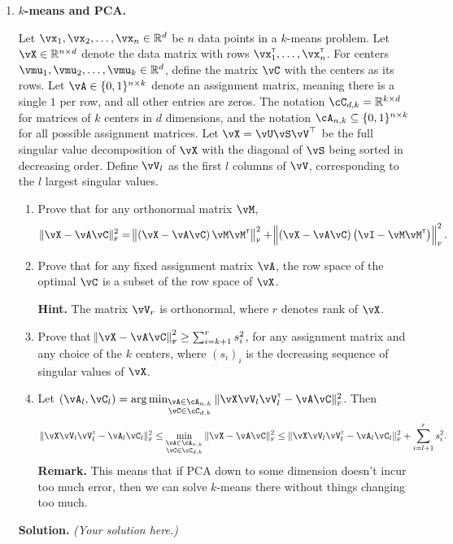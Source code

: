 \documentclass{article}
\DeclareMathOperator*{\argmin}{arg\,min}
\def\R{\mathbb{R}}
\def\tF{{\scriptscriptstyle\textup{F}}}
\newcommand\T{{\scriptscriptstyle\mathsf{T}}}
\theoremstyle{definition}
\theoremstyle{remark}
\newenvironment{Q}
{%
\clearpage
\item
}
{%
\phantom{s}
\bigskip
\textbf{Solution.}
\emph{(Your solution here.)}
}
\begin{document}
\begin{enumerate}

  \begin{Q}
    \textbf{$k$-means and PCA.}

    Let $\vx_1, \vx_2, \ldots, \vx_n \in \R^d$ be $n$ data points in a $k$-means problem. Let $\vX\in\R^{n\times d}$ denote the data matrix with rows $\vx_1^\T,\ldots,\vx_n^\T$. For centers $\vmu_1, \vmu_2, \ldots, \vmu_k \in \R^d$, define the matrix $\vC$ with the centers as its rows. Let $\vA\in\{0,1\}^{n\times k}$ denote an assignment matrix, meaning there is a single $1$ per row, and all other entries are zeros.  The notation $\cC_{d,k}=\R^{k \times d}$ for matrices of $k$ centers in $d$ dimensions, and the notation $\cA_{n,k}\subseteq \{0,1\}^{n\times k}$ for all possible assignment matrices. Let $\vX = \vU\vS\vV^\top$ be the full singular value decomposition of $\vX$ with the diagonal of $\vS$ being sorted in decreasing order. Define $\vV_l$ as the first $l$ columns of $\vV$, corresponding to the $l$ largest singular values.

    \begin{enumerate}
      \item
        Prove that for any orthonormal matrix $\vM$,
        \[
          \|\vX - \vA\vC\|_\tF^2
          =
          \enVert{ \del{\vX - \vA\vC}\vM\vM^\T }_\tF^2
          +
          \enVert{ \del{\vX - \vA\vC}\del{\vI - \vM\vM^\T} }_\tF^2.
        \]

      \item
        Prove that for any fixed assignment matrix $\vA$, the row space of the optimal $\vC$ is a subset of the row space of $\vX$.

        \textbf{Hint.} The matrix $\vV_r$ is orthonormal, where $r$ denotes rank of $\vX$.

      \item
        Prove that $\enVert{ \vX - \vA\vC}_\tF^2 \geq \sum_{i=k+1}^r s_i^2$, for any assignment matrix and any choice of the $k$ centers, where $(s_i)_i$ is the decreasing sequence of singular values of $\vX$.

      \item
        Let $(\vA_l,\vC_l) = \argmin_{\substack{\vA\in\cA_{n,k}\\\vC\in\cC_{d,k}}} \|\vX\vV_l\vV_l^\T - \vA\vC\|_\tF^2$. Then
        \[
          \|\vX\vV_l\vV_l^\T - \vA_l\vC_l\|_\tF^2
          \leq
          \min_{\substack{\vA\in\cA_{n,k}\\\vC\in\cC_{d,k}}} \|\vX - \vA\vC\|_\tF^2
          \leq
          \|\vX\vV_l\vV_l^\T - \vA_l\vC_l\|_\tF^2
          + \sum_{i=l+1}^r s_i^2.
        \]
        \textbf{Remark.}  This means that if PCA down to some dimension doesn't incur too much error, then we can solve $k$-means there without things changing too much.
    \end{enumerate}
  \end{Q}



\end{enumerate}
\end{document}
